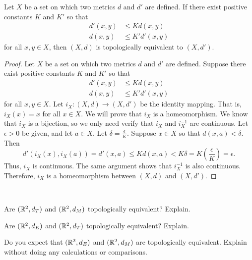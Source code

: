 \begin{theorem} Let $X$ be a set on which two metrics $d$ and $d'$ are defined. If there exist positive constants $K$ and $K'$ so that 
\begin{align*}
d'(x,y) &\leq K d(x,y) \\
d(x,y) &\leq K' d'(x,y)
\end{align*}
for all $x,y \in X$, then $(X,d)$ is topologically equivalent to $(X,d')$.  
\end{theorem}

\begin{proof} Let $X$ be a set on which two metrics $d$ and $d'$ are defined. Suppose there exist positive constants $K$ and $K'$ so that 
\begin{align*}
d'(x,y) &\leq K d(x,y) \\
d(x,y) &\leq K' d'(x,y)
\end{align*}
for all $x,y \in X$. Let $i_X : (X,d) \to (X,d')$ be the identity mapping. That is, $i_X(x)=x$ for all $x \in X$. We will prove that $i_X$ is a homeomorphism. We know that $i_X$ is a bijection, so we only need verify that $i_X$ and $i_X^{-1}$ are continuous. Let $\epsilon > 0$ be given, and let $a \in X$. Let $\delta = \frac{\epsilon}{K}$. Suppose $x \in X$ so that $d(x,a) < \delta$. Then 
\[d'(i_X(x), i_X(a)) = d'(x,a) \leq Kd(x,a) < K\delta = K\left(\frac{\epsilon}{K}\right) = \epsilon.\]
Thus, $i_X$ is continuous. The same argument shows that $i_X^{-1}$ is also continuous. Therefore, $i_X$ is a homeomorphism between $(X,d)$ and $(X,d')$. 
\end{proof}


\begin{activity} ~
\ba
\item Are $(\mathbb{R}^2,d_T)$ and $(\mathbb{R}^2, d_M)$ topologically equivalent? Explain.

\item Are $(\mathbb{R}^2,d_E)$ and $(\mathbb{R}^2, d_T)$ topologically equivalent? Explain.

\item Do you expect that $(\mathbb{R}^2,d_E)$ and $(\mathbb{R}^2, d_M)$ are topologically equivalent. Explain without doing any calculations or comparisons.

\ea

\end{activity}

